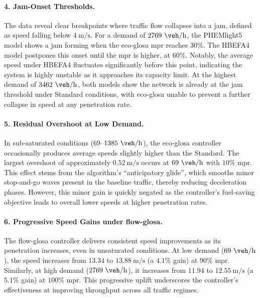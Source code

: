\paragraph{4. Jam-Onset Thresholds.}
The data reveal clear breakpoints where traffic flow collapses into a jam, defined as speed falling below $4~\unit{\metre\per\second}$. For a demand of $2769~\unit{\veh\per\hour}$, the PHEMlight5 model shows a jam forming when the \ac{eco-glosa} \ac{mpr} reaches $30\%$. The HBEFA4 model postpones this onset until the \ac{mpr} is higher, at $60\%$. Notably, the average speed under HBEFA4 fluctuates significantly before this point, indicating the system is highly unstable as it approaches its capacity limit. At the highest demand of $3462~\unit{\veh\per\hour}$, both models show the network is already at the jam threshold under Standard conditions, with \ac{eco-glosa} unable to prevent a further collapse in speed at any penetration rate.

\paragraph{5. Residual Overshoot at Low Demand.}
In sub-saturated conditions ($69$--$1385~\unit{\veh\per\hour}$), the \ac{eco-glosa} controller occasionally produces average speeds slightly higher than the Standard. The largest overshoot of approximately $0.52~\unit{\metre\per\second}$ occurs at $69~\unit{\veh\per\hour}$ with $10\%$ \ac{mpr}. This effect stems from the algorithm's \enquote{anticipatory glide}, which smooths minor stop-and-go waves present in the baseline traffic, thereby reducing deceleration phases. However, this minor gain is quickly negated as the controller's fuel-saving objective leads to overall lower speeds at higher penetration rates.

\paragraph{6. Progressive Speed Gains under \ac{flow-glosa}.}
The \ac{flow-glosa} controller delivers consistent speed improvements as its penetration increases, even in unsaturated conditions. At low demand ($69~\unit{\veh\per\hour}$), the speed increases from $13.34$ to $13.88~\unit{\metre\per\second}$ (a $4.1\%$ gain) at $90\%$ \ac{mpr}. Similarly, at high demand ($2769~\unit{\veh\per\hour}$), it increases from $11.94$ to $12.55~\unit{\metre\per\second}$ (a $5.1\%$ gain) at $100\%$ \ac{mpr}. This progressive uplift underscores the controller's effectiveness at improving throughput across all traffic regimes.

